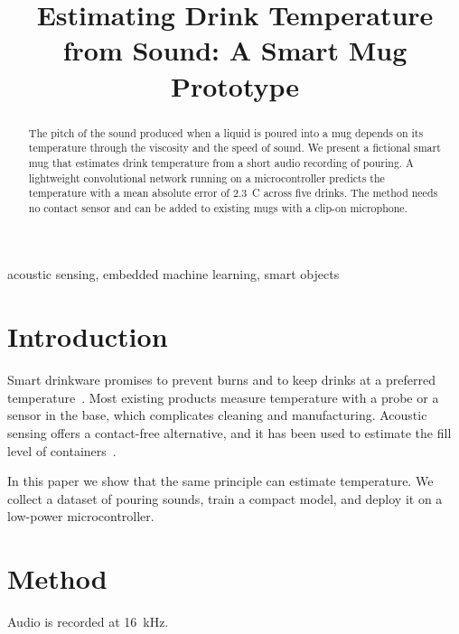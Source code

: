 \documentclass[conference]{IEEEtran}
\begin{document}
\title{Estimating Drink Temperature from Sound: A Smart Mug Prototype}
\author{
\and
{}
}
\maketitle
\begin{abstract}
The pitch of the sound produced when a liquid is poured into a mug depends on its temperature through the viscosity and the speed of sound.
We present a fictional smart mug that estimates drink temperature from a short audio recording of pouring.
A lightweight convolutional network running on a microcontroller predicts the temperature with a mean absolute error of 2.3~\textdegree C across five drinks.
The method needs no contact sensor and can be added to existing mugs with a clip-on microphone.
\end{abstract}
\begin{IEEEkeywords}
acoustic sensing, embedded machine learning, smart objects
\end{IEEEkeywords}
\section{Introduction}
Smart drinkware promises to prevent burns and to keep drinks at a preferred temperature~\cite{morimoto2021,westwood2022}.
Most existing products measure temperature with a probe or a sensor in the base, which complicates cleaning and manufacturing.
Acoustic sensing offers a contact-free alternative, and it has been used to estimate the fill level of containers~\cite{morimoto2023}.

In this paper we show that the same principle can estimate temperature.
We collect a dataset of pouring sounds, train a compact model, and deploy it on a low-power microcontroller.

\section{Method}
Audio is recorded at 16~kHz.


\end{document}
